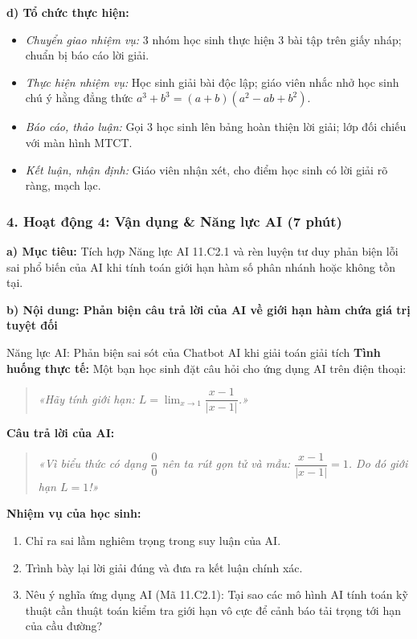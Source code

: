 \documentclass[12pt, a4paper]{article}
\begin{document}
\noindent \textbf{d) Tổ chức thực hiện:}
\begin{itemize}[leftmargin=0.8cm]
    \item \textit{Chuyển giao nhiệm vụ:} 3 nhóm học sinh thực hiện 3 bài tập trên giấy nháp; chuẩn bị báo cáo lời giải.
    \item \textit{Thực hiện nhiệm vụ:} Học sinh giải bài độc lập; giáo viên nhắc nhở học sinh chú ý hằng đẳng thức $a^3 + b^3 = (a+b)(a^2 - ab + b^2)$.
    \item \textit{Báo cáo, thảo luận:} Gọi 3 học sinh lên bảng hoàn thiện lời giải; lớp đối chiếu với màn hình MTCT.
    \item \textit{Kết luận, nhận định:} Giáo viên nhận xét, cho điểm học sinh có lời giải rõ ràng, mạch lạc.
\end{itemize}

\subsubsection*{4. Hoạt động 4: Vận dụng \& Năng lực AI (7 phút)}

\noindent \textbf{a) Mục tiêu:}
Tích hợp Năng lực AI 11.C2.1 và rèn luyện tư duy phản biện lỗi sai phổ biến của AI khi tính toán giới hạn hàm số phân nhánh hoặc không tồn tại.

\noindent \textbf{b) Nội dung: Phản biện câu trả lời của AI về giới hạn hàm chứa giá trị tuyệt đối}
\begin{aibox}{Năng lực AI: Phản biện sai sót của Chatbot AI khi giải toán giải tích}
\textbf{Tình huống thực tế:} Một bạn học sinh đặt câu hỏi cho ứng dụng AI trên điện thoại:
\begin{quote}
\textit{«Hãy tính giới hạn: $L = \lim_{x \to 1} \dfrac{x - 1}{|x - 1|}$.»}
\end{quote}
\textbf{Câu trả lời của AI:}
\begin{quote}
\textit{«Vì biểu thức có dạng $\dfrac{0}{0}$ nên ta rút gọn tử và mẫu: $\dfrac{x - 1}{|x - 1|} = 1$. Do đó giới hạn $L = 1$!»}
\end{quote}
\textbf{Nhiệm vụ của học sinh:}
\begin{enumerate}[leftmargin=0.6cm]
    \item Chỉ ra sai lầm nghiêm trọng trong suy luận của AI.
    \item Trình bày lại lời giải đúng và đưa ra kết luận chính xác.
    \item Nêu ý nghĩa ứng dụng AI (Mã 11.C2.1): Tại sao các mô hình AI tính toán kỹ thuật cần thuật toán kiểm tra giới hạn vô cực để cảnh báo tải trọng tới hạn của cầu đường?
\end{enumerate}
\end{aibox}
\end{document}
